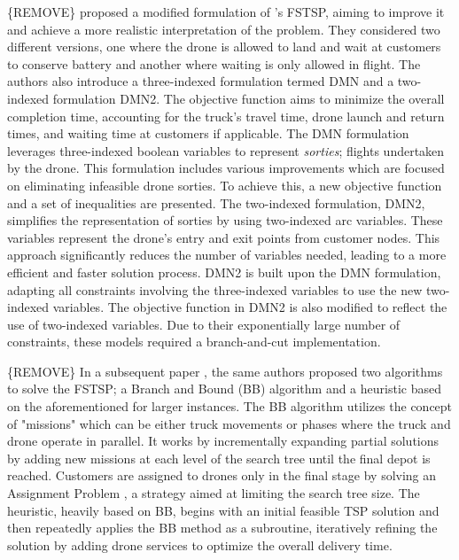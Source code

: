 \documentclass{article}
\begin{document}
	\par
	\{REMOVE\}
	\citeauthor{DellAmico2019} \cite{DellAmico2019} proposed a modified formulation of \citeauthor{Murray2015}'s FSTSP, aiming to improve it and achieve a more realistic interpretation of the problem. They considered two different versions, one where the drone is allowed to land and wait at customers to conserve battery and another where waiting is only allowed in flight. The authors also introduce a three-indexed formulation termed DMN and a two-indexed formulation DMN2. The objective function aims to minimize the overall completion time, accounting for the truck's travel time, drone launch and return times, and waiting time at customers if applicable.
	The DMN formulation leverages three-indexed boolean variables to represent \textit{sorties}; flights undertaken by the drone. This formulation includes various improvements which are focused on eliminating infeasible drone sorties. To achieve this, a new objective function and a set of inequalities are presented.
	The two-indexed formulation, DMN2, simplifies the representation of sorties by using two-indexed arc variables. These variables represent the drone's entry and exit points from customer nodes. This approach significantly reduces the number of variables needed, leading to a more efficient and faster solution process. DMN2 is built upon the DMN formulation, adapting all constraints involving the three-indexed variables to use the new two-indexed variables. The objective function in DMN2 is also modified to reflect the use of two-indexed variables. Due to their exponentially large number of constraints, these models required a branch-and-cut implementation.
	\par
	\{REMOVE\}
	In a subsequent paper \cite{DellAmico2021}, the same authors proposed two algorithms to solve the FSTSP; a Branch and Bound (BB) algorithm and a heuristic based on the aforementioned for larger instances. The BB algorithm utilizes the concept of "missions" which can be either truck movements or phases where the truck and drone operate in parallel. It works by incrementally expanding partial solutions by adding new missions at each level of the search tree until the final depot is reached. Customers are assigned to drones only in the final stage by solving an Assignment Problem \cite{AssignmentProblemSurvey2006}, a strategy aimed at limiting the search tree size. The heuristic, heavily based on BB, begins with an initial feasible TSP solution and then repeatedly applies the BB method as a subroutine, iteratively refining the solution by adding drone services to optimize the overall delivery time.
\end{document}
